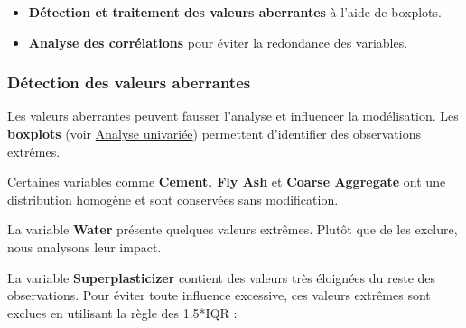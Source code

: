 \documentclass[
  12pt,
]{article}
\newenvironment{Shaded}{\begin{snugshade}}{\end{snugshade}}
\newcommand{\CommentTok}[1]{\textcolor[rgb]{0.56,0.35,0.01}{\textit{#1}}}
\newcommand{\FloatTok}[1]{\textcolor[rgb]{0.00,0.00,0.81}{#1}}
\newcommand{\FunctionTok}[1]{\textcolor[rgb]{0.13,0.29,0.53}{\textbf{#1}}}
\newcommand{\NormalTok}[1]{#1}
\newcommand{\OtherTok}[1]{\textcolor[rgb]{0.56,0.35,0.01}{#1}}
\newcommand{\SpecialCharTok}[1]{\textcolor[rgb]{0.81,0.36,0.00}{\textbf{#1}}}
\providecommand{\tightlist}{%
  \setlength{\itemsep}{0pt}\setlength{\parskip}{0pt}}
\begin{document}
\begin{itemize}
\tightlist
\item
  \textbf{Détection et traitement des valeurs aberrantes} à l'aide de
  boxplots.\\
\item
  \textbf{Analyse des corrélations} pour éviter la redondance des
  variables.
\end{itemize}

\subsubsection{Détection des valeurs
aberrantes}\label{duxe9tection-des-valeurs-aberrantes}

Les valeurs aberrantes peuvent fausser l'analyse et influencer la
modélisation. Les \textbf{boxplots} (voir
\hyperref[duxe9tection-des-valeurs-aberrantes-boxplots]{Analyse
univariée}) permettent d'identifier des observations extrêmes.

Certaines variables comme \textbf{Cement, Fly Ash} et \textbf{Coarse
Aggregate} ont une distribution homogène et sont conservées sans
modification.

La variable \textbf{Water} présente quelques valeurs extrêmes. Plutôt
que de les exclure, nous analysons leur impact.

La variable \textbf{Superplasticizer} contient des valeurs très
éloignées du reste des observations. Pour éviter toute influence
excessive, ces valeurs extrêmes sont exclues en utilisant la règle des
1.5*IQR :

\begin{Shaded}
\end{Shaded}
\end{document}
